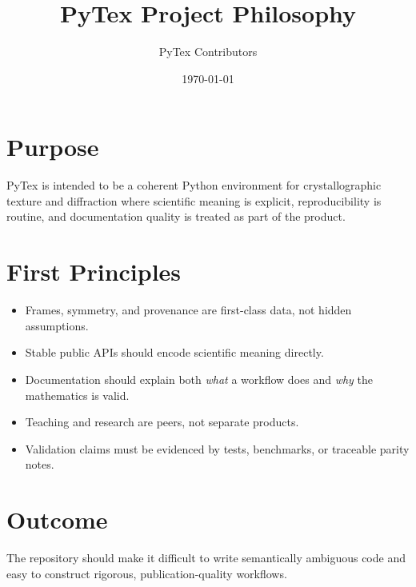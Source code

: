 \documentclass[11pt]{article}
\title{PyTex Project Philosophy}
\author{PyTex Contributors}
\date{\today}
\begin{document}
\maketitle

\section{Purpose}

PyTex is intended to be a coherent Python environment for crystallographic texture and diffraction where scientific meaning is explicit, reproducibility is routine, and documentation quality is treated as part of the product.

\section{First Principles}

\begin{itemize}
  \item Frames, symmetry, and provenance are first-class data, not hidden assumptions.
  \item Stable public APIs should encode scientific meaning directly.
  \item Documentation should explain both \emph{what} a workflow does and \emph{why} the mathematics is valid.
  \item Teaching and research are peers, not separate products.
  \item Validation claims must be evidenced by tests, benchmarks, or traceable parity notes.
\end{itemize}

\section{Outcome}

The repository should make it difficult to write semantically ambiguous code and easy to construct rigorous, publication-quality workflows.
\end{document}

